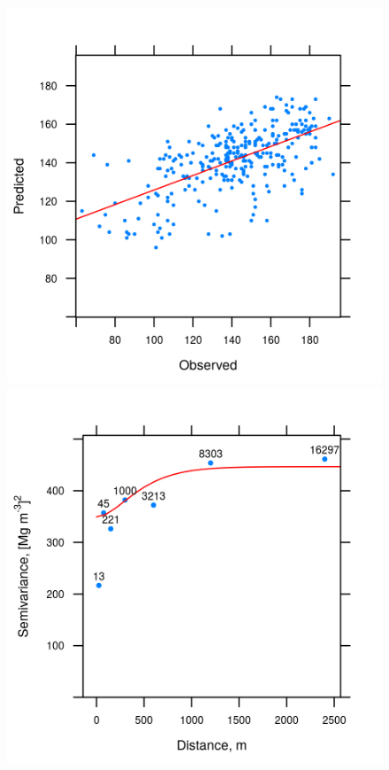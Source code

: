 \begin{figure}[!ht]
 \centering
 \begin{minipage}{0.60\textwidth}
  \subcaption{}
  \centering
  \includegraphics[width = \textwidth]{fig/chap08-random-forest-fit}
 \end{minipage}
 \begin{minipage}{0.60\textwidth}
  \centering
  \subcaption{}
  \includegraphics[width = \textwidth]{fig/chap08-bude-vario}

\end{minipage}
\end{figure}
